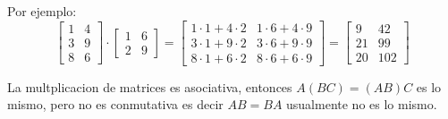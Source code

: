 Por ejemplo:
$$
\begin{bmatrix}
   1 & 4 \\
   3 & 9 \\
   8 & 6 
\end{bmatrix}
\cdot
\begin{bmatrix}
	1 & 6 \\
	2 & 9
\end{bmatrix}   
= \begin{bmatrix}
	1 \cdot 1 + 4 \cdot 2  & 1 \cdot 6 + 4 \cdot 9  \\
	3 \cdot 1 + 9 \cdot 2 &  3 \cdot 6 + 9 \cdot 9 \\
	8 \cdot 1 + 6 \cdot 2 &  8 \cdot 6 + 6 \cdot 9 
\end{bmatrix} =
\begin{bmatrix}
	9 & 42 \\
	21 & 99 \\
	20 & 102 
\end{bmatrix}$$

La multplicacion de matrices es asociativa, entonces $A(BC) = (AB)C$ es lo mismo, pero no es conmutativa es decir $AB = BA$ usualmente no es lo mismo. 
